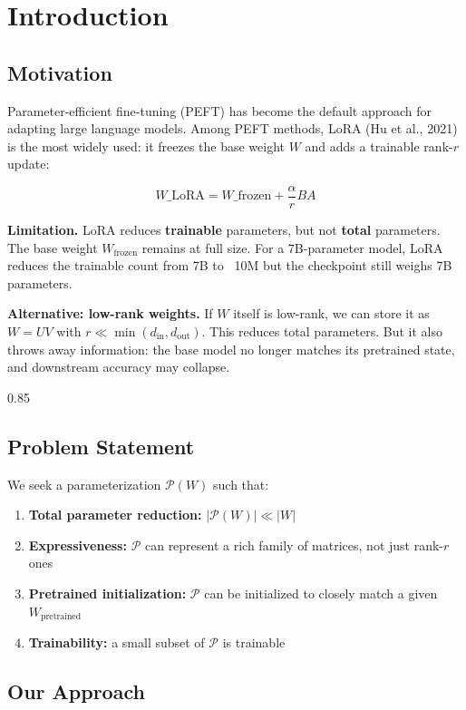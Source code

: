 
\section{Introduction}

\subsection{Motivation}

Parameter-efficient fine-tuning (PEFT) has become the default approach for 
adapting large language models. Among PEFT methods, LoRA (Hu et al., 2021) 
is the most widely used: it freezes the base weight $W$ and adds a trainable 
rank-$r$ update:

\[
W\_\text{LoRA} = W\_\text{frozen} + \frac{\alpha}{r} B A
\tag{1.1}
\]

\textbf{Limitation.} LoRA reduces \textbf{trainable} parameters, but not \textbf{total} 
parameters. The base weight $W_\text{frozen}$ remains at full size. For a 
7B-parameter model, LoRA reduces the trainable count from 7B to ~10M but 
the checkpoint still weighs 7B parameters.

\textbf{Alternative: low-rank weights.} If $W$ itself is low-rank, we can store 
it as $W = U V$ with $r \ll \min(d_\text{in}, d_\text{out})$. This reduces 
total parameters. But it also throws away information: the base model no 
longer matches its pretrained state, and downstream accuracy may collapse.

0.85


\subsection{Problem Statement}

We seek a parameterization $\mathcal{P}(W)$ such that:

\begin{enumerate}
\item \textbf{Total parameter reduction:} $|\mathcal{P}(W)| \ll |W|$
\item \textbf{Expressiveness:} $\mathcal{P}$ can represent a rich family of matrices,
  not just rank-$r$ ones
\item \textbf{Pretrained initialization:} $\mathcal{P}$ can be initialized to closely
  match a given $W_\text{pretrained}$
\item \textbf{Trainability:} a small subset of $\mathcal{P}$ is trainable

\end{enumerate}
\subsection{Our Approach}

